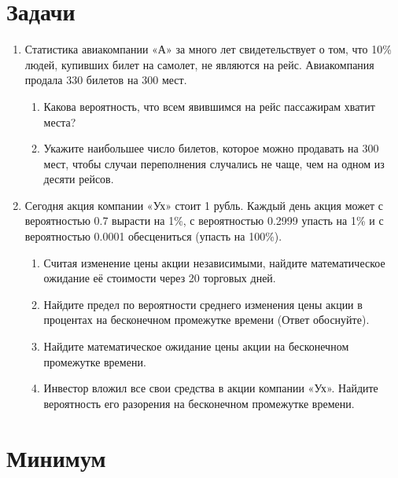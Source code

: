\documentclass[11pt]{article} %
\begin{document}
\section{Задачи}

\begin{enumerate}[resume]

\item Статистика авиакомпании «А» за много лет свидетельствует о том, что 10\% людей, купивших билет на самолет, не являются на рейс. Авиакомпания продала 330 билетов на 300 мест.
\begin{enumerate}
\item Какова вероятность, что всем явившимся на рейс пассажирам хватит места?
\item Укажите наибольшее число билетов, которое можно продавать на 300 мест, чтобы случаи переполнения случались не чаще, чем на одном из десяти рейсов.
\end{enumerate}

\item Сегодня акция компании «Ух» стоит 1 рубль. Каждый день акция может с вероятностью 0.7 вырасти на 1\%, с вероятностью 0.2999 упасть на 1\% и с вероятностью 0.0001 обесцениться (упасть на 100\%).
\begin{enumerate}
\item Считая изменение цены акции независимыми, найдите математическое ожидание её стоимости через 20 торговых дней.
\item Найдите предел по вероятности среднего изменения цены акции в процентах на бесконечном промежутке времени (Ответ обоснуйте).
\item Найдите математическое ожидание цены акции на бесконечном промежутке времени.
\item Инвестор вложил все свои средства в акции компании «Ух». Найдите вероятность его разорения на бесконечном промежутке времени.
\end{enumerate}


\end{enumerate}




\newpage
\setcounter{page}{1}
\setcounter{section}{0}
\chead{}
\cfoot{}
\rfoot{\thepage/\pageref{LastPage}}


\section{Минимум}
\end{document}
